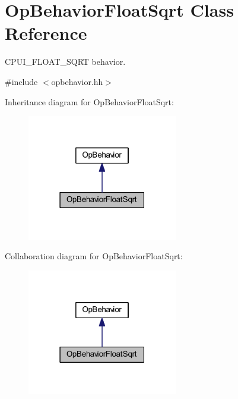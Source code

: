 \hypertarget{class_op_behavior_float_sqrt}{}\section{Op\+Behavior\+Float\+Sqrt Class Reference}
\label{class_op_behavior_float_sqrt}


C\+P\+U\+I\+\_\+\+F\+L\+O\+A\+T\+\_\+\+S\+Q\+RT behavior.  




{\ttfamily \#include $<$opbehavior.\+hh$>$}



Inheritance diagram for Op\+Behavior\+Float\+Sqrt\+:
\nopagebreak
\begin{figure}[H]
\begin{center}
\leavevmode
\includegraphics[width=186pt]{class_op_behavior_float_sqrt__inherit__graph}
\end{center}
\end{figure}


Collaboration diagram for Op\+Behavior\+Float\+Sqrt\+:
\nopagebreak
\begin{figure}[H]
\begin{center}
\leavevmode
\includegraphics[width=186pt]{class_op_behavior_float_sqrt__coll__graph}
\end{center}
\end{figure}
